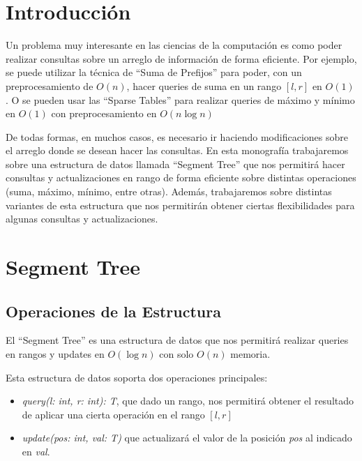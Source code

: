 \documentclass{article}
\begin{document}
\maketitle
\tableofcontents
\newpage

\section{Introducción}
Un problema muy interesante en las ciencias de la computación es como poder realizar consultas sobre un arreglo de información de forma eficiente. Por ejemplo, se puede utilizar la técnica de ``Suma de Prefijos'' para poder, con un preprocesamiento de $O(n)$, hacer queries de suma en un rango $[l,r]$ en $O(1)$. O se pueden usar las ``Sparse Tables'' para realizar queries de máximo y mínimo en $O(1)$ con preprocesamiento en $O(n \log n)$

De todas formas, en muchos casos, es necesario ir haciendo modificaciones sobre el arreglo donde se desean hacer las consultas. En esta monografía trabajaremos sobre una estructura de datos llamada ``Segment Tree'' que nos permitirá hacer consultas y actualizaciones en rango de forma eficiente sobre distintas operaciones (suma, máximo, mínimo, entre otras). Además, trabajaremos sobre distintas variantes de esta estructura que nos permitirán obtener ciertas flexibilidades para algunas consultas y actualizaciones.

\section{Segment Tree}
\subsection{Operaciones de la Estructura}

El ``Segment Tree''  es una estructura de datos que nos permitirá realizar queries en rangos y updates en $O(\log n)$ con solo $O(n)$ memoria.

Esta estructura de datos soporta dos operaciones principales:
\begin{itemize}
    \item \textit{query(l: int, r: int): T}, que dado un rango, nos permitirá obtener el resultado de aplicar una cierta operación en el rango $[l,r]$
    \item  \textit{update(pos: int, val: T)} que actualizará el valor de la posición \textit{pos} al indicado en \textit{val}.
\end{itemize}
\end{document}
